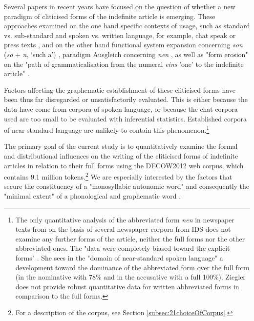 Several papers in recent years have focused on the question of whether a new paradigm of cliticised forms of the indefinite article is emerging.
These approaches examined on the one hand specific contexts of usage, such as standard vs. sub-standard \citep{Volmert1995,Schiering2002,Ziegler2011} and spoken vs. written language, for example, chat speak or press texts \citep{Tophinke2002,Burri2003,Vogel2006,Ziegler2012}, and on the other hand functional system expansion concerning \textit{son} (\textit{so} + \textit{n}, `such a') \citep{HoleKlumpp2000,LenerzLohnstein2005,Eroms2008,Heusinger2012}, paradigm Ausgleich concerning \textit{nen} \citep{Vogel2006}, as well as "form erosion" on the "path of grammaticalisation from the numeral \textit{eins} 'one' to the indefinite article" \citep[79]{Szczepaniak2009}.

Factors affecting the graphematic establishment of these cliticised forms have been thus far disregarded or unsatisfactorily evaluated.
This is either because the data have come from corpora of spoken language, or because the chat corpora used are too small to be evaluated with inferential statistics. Established corpora of near-standard language are unlikely to contain this phenomenon.\footnote{
	The only quantitative analysis of the abbreviated form \textit{nen} in newspaper texts from \citet{Ziegler2012} on the basis of several newspaper corpora from IDS \citep{KupietzKeibel2009} does not examine any further forms of the article, neither the full forms nor the other abbreviated ones.
	The "data were completely biased toward the explicit forms" \citep[301]{Ziegler2012}.
	She sees in the "domain of near-standard spoken language" a development toward the dominance of the abbreviated form over the full form (in the nominative with 78\% and in the accusative with a full 100\%).
	Ziegler does not provide robust quantitative data for written abbreviated forms in comparison to the full forms.}

The primary goal of the current study is to quantitatively examine the formal and distributional influences on the writing of the cliticised forms of indefinite articles in relation to their full forms using the DECOW2012 web corpus, which contains 9.1 million tokens.\footnote{
	For a description of the corpus, see Section \ref{subsec:21choiceOfCorpus}.}
We are especially interested by the factors that secure the constituency of a "monosyllabic autonomic word" \citep[188]{Vogel2006} and consequently the "minimal extent" of a phonological and graphematic word \citep{Jacobs2005,Fuhrhop2008}.

